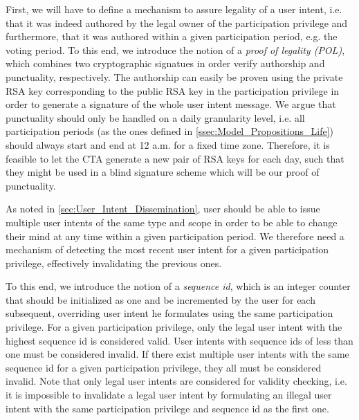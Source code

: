 First, we will have to define a mechanism to assure legality of a user intent, i.e. that it was indeed authored by the legal owner of the participation privilege and furthermore, that it was authored within a given participation period, e.g. the voting period.
To this end, we introduce the notion of a \emph{proof of legality (POL)}, which combines two cryptographic signatues in order verify authorship and punctuality, respectively.
The authorship can easily be proven using the private RSA key corresponding to the public RSA key in the participation privilege in order to generate a signature of the whole user intent message.
We argue that punctuality should only be handled on a daily granularity level, i.e. all participation periods (as the ones defined in \autoref{ssec:Model_Propositions_Life}) should always start and end at 12 a.m. for a fixed time zone.
Therefore, it is feasible to let the CTA generate a new pair of RSA keys for each day, such that they might be used in a blind signature scheme which will be our proof of punctuality.

As noted in \autoref{sec:User_Intent_Dissemination}, user should be able to issue multiple user intents of the same type and scope in order to be able to change their mind at any time within a given participation period.
We therefore need a mechanism of detecting the most recent user intent for a given participation privilege, effectively invalidating the previous ones.

To this end, we introduce the notion of a \emph{sequence id}, which is an integer counter that should be initialized as one and be incremented by the user for each subsequent, overriding user intent he formulates using the same participation privilege.
For a given participation privilege, only the legal user intent with the highest sequence id is considered valid.
User intents with sequence ids of less than one must be considered invalid.
If there exist multiple user intents with the same sequence id for a given participation privilege, they all  must be considered invalid. 
Note that only legal user intents are considered for validity checking, i.e. it is impossible to invalidate a legal user intent by formulating an illegal user intent with the same participation privilege and sequence id as the first one.

